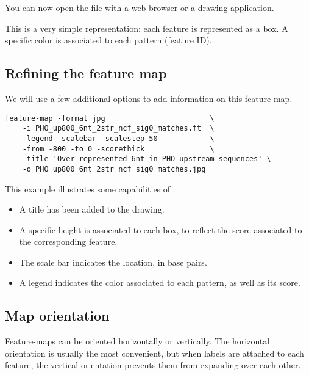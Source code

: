 You can now open the file
 with a web
browser or a drawing application.

This is a very simple representation: each feature is represented as a
box. A specific color is associated to each pattern (feature ID). 

\subsection{Refining the feature map}

We will use a few additional options to add information on this
feature map. 

{\color{Blue} \begin{footnotesize} 
\begin{verbatim}
feature-map -format jpg                        \
    -i PHO_up800_6nt_2str_ncf_sig0_matches.ft  \
    -legend -scalebar -scalestep 50            \
    -from -800 -to 0 -scorethick               \
    -title 'Over-represented 6nt in PHO upstream sequences' \
    -o PHO_up800_6nt_2str_ncf_sig0_matches.jpg
\end{verbatim} \end{footnotesize}
}

This example illustrates some capabilities of :

\begin{itemize}
\item A title has been added to the drawing. 

\item A specific height is associated to each box, to reflect
the score associated to the corresponding feature.

\item The scale bar indicates the location, in base pairs. 

\item A legend indicates the color associated to each pattern, as well 
as its score. 

\end{itemize}

\subsection{Map orientation}

Feature-maps can be oriented horizontally or vertically. The
horizontal orientation is usually the most convenient, but when labels
are attached to each feature, the vertical orientation prevents them
from expanding over each other.

